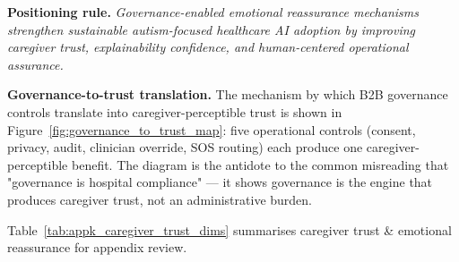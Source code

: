 \noindent\textbf{Positioning rule.} \emph{Governance-enabled emotional reassurance mechanisms strengthen sustainable autism-focused healthcare AI adoption by improving caregiver trust, explainability confidence, and human-centered operational assurance.}

\noindent\textbf{Governance-to-trust translation.} The mechanism by which B2B governance controls translate into caregiver-perceptible trust is shown in Figure~\ref{fig:governance_to_trust_map}: five operational controls (consent, privacy, audit, clinician override, SOS routing) each produce one caregiver-perceptible benefit. The diagram is the antidote to the common misreading that "governance is hospital compliance" --- it shows governance is the engine that produces caregiver trust, not an administrative burden.



\noindent Table~\ref{tab:appk_caregiver_trust_dims} summarises caregiver trust \& emotional reassurance for appendix review.


